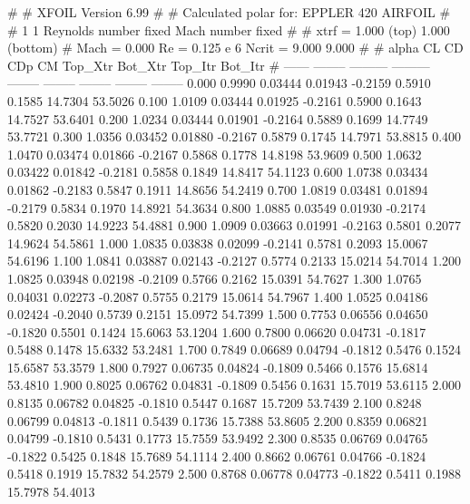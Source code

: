 #  
#       XFOIL         Version 6.99
#  
# Calculated polar for: EPPLER 420 AIRFOIL                              
#  
# 1 1 Reynolds number fixed          Mach number fixed         
#  
# xtrf =   1.000 (top)        1.000 (bottom)  
# Mach =   0.000     Re =     0.125 e 6     Ncrit =   9.000  9.000
#  
#   alpha    CL        CD       CDp       CM     Top_Xtr  Bot_Xtr  Top_Itr  Bot_Itr
#  ------ -------- --------- --------- -------- -------- -------- -------- --------
   0.000   0.9990   0.03444   0.01943  -0.2159   0.5910   0.1585  14.7304  53.5026
   0.100   1.0109   0.03444   0.01925  -0.2161   0.5900   0.1643  14.7527  53.6401
   0.200   1.0234   0.03444   0.01901  -0.2164   0.5889   0.1699  14.7749  53.7721
   0.300   1.0356   0.03452   0.01880  -0.2167   0.5879   0.1745  14.7971  53.8815
   0.400   1.0470   0.03474   0.01866  -0.2167   0.5868   0.1778  14.8198  53.9609
   0.500   1.0632   0.03422   0.01842  -0.2181   0.5858   0.1849  14.8417  54.1123
   0.600   1.0738   0.03434   0.01862  -0.2183   0.5847   0.1911  14.8656  54.2419
   0.700   1.0819   0.03481   0.01894  -0.2179   0.5834   0.1970  14.8921  54.3634
   0.800   1.0885   0.03549   0.01930  -0.2174   0.5820   0.2030  14.9223  54.4881
   0.900   1.0909   0.03663   0.01991  -0.2163   0.5801   0.2077  14.9624  54.5861
   1.000   1.0835   0.03838   0.02099  -0.2141   0.5781   0.2093  15.0067  54.6196
   1.100   1.0841   0.03887   0.02143  -0.2127   0.5774   0.2133  15.0214  54.7014
   1.200   1.0825   0.03948   0.02198  -0.2109   0.5766   0.2162  15.0391  54.7627
   1.300   1.0765   0.04031   0.02273  -0.2087   0.5755   0.2179  15.0614  54.7967
   1.400   1.0525   0.04186   0.02424  -0.2040   0.5739   0.2151  15.0972  54.7399
   1.500   0.7753   0.06556   0.04650  -0.1820   0.5501   0.1424  15.6063  53.1204
   1.600   0.7800   0.06620   0.04731  -0.1817   0.5488   0.1478  15.6332  53.2481
   1.700   0.7849   0.06689   0.04794  -0.1812   0.5476   0.1524  15.6587  53.3579
   1.800   0.7927   0.06735   0.04824  -0.1809   0.5466   0.1576  15.6814  53.4810
   1.900   0.8025   0.06762   0.04831  -0.1809   0.5456   0.1631  15.7019  53.6115
   2.000   0.8135   0.06782   0.04825  -0.1810   0.5447   0.1687  15.7209  53.7439
   2.100   0.8248   0.06799   0.04813  -0.1811   0.5439   0.1736  15.7388  53.8605
   2.200   0.8359   0.06821   0.04799  -0.1810   0.5431   0.1773  15.7559  53.9492
   2.300   0.8535   0.06769   0.04765  -0.1822   0.5425   0.1848  15.7689  54.1114
   2.400   0.8662   0.06761   0.04766  -0.1824   0.5418   0.1919  15.7832  54.2579
   2.500   0.8768   0.06778   0.04773  -0.1822   0.5411   0.1988  15.7978  54.4013
